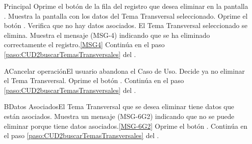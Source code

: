 	\begin{UCtrayectoria}{Principal}
			\UCpaso[\UCactor] Oprime el botón  de la fila del registro que desea eliminar en la pantalla .	
			\UCpaso Muestra la pantalla  con los datos del Tema Transversal seleccionado. 
			\UCpaso [\UCactor] Oprime el botón . 
			\UCpaso Verifica que no hay datos asociados. 
			\UCpaso El Tema Transversal seleccionado se elimina.
			\UCpaso Muestra el mensaje (MSG-4) indicando que se ha eliminado correctamente el registro.\ref{MSG4}
			\UCpaso Continúa en el paso \ref{paso:CUD2buscarTemasTransversales} del .
	\end{UCtrayectoria}

		\begin{UCtrayectoriaA}{A}{Cancelar operación}{El usuario abandona el Caso de Uso.}
			\UCpaso[\UCactor] Decide ya no eliminar el Tema Transversal.
			\UCpaso[\UCactor] Oprime el botón .
			\UCpaso Continúa en el paso \ref{paso:CUD2buscarTemasTransversales} del .
		\end{UCtrayectoriaA}
		
		\begin{UCtrayectoriaA}{B}{Datos Asociados}{El Tema Transversal que se desea eliminar tiene datos que están asociados.}
			\UCpaso Muestra un mensaje (MSG-6G2) indicando que no se puede eliminar porque tiene datos asociados.\ref{MSG-6G2}
			\UCpaso [\UCactor] Oprime el botón .
			\UCpaso Continúa en el paso \ref{paso:CUD2buscarTemasTransversales} del .
		\end{UCtrayectoriaA}
